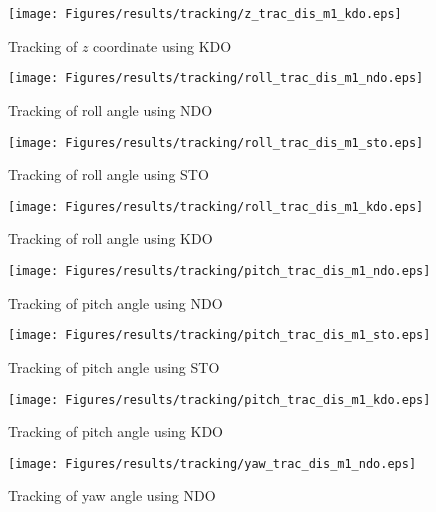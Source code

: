 \documentclass{article}
\begin{document}
\begin{figure}[H]
\centering
\texttt{[image: Figures/results/tracking/z\_trac\_dis\_m1\_kdo.eps]}
\caption{Tracking of $z$ coordinate using KDO}
\label{z_trac_dis_m1_kdo}
\end{figure}

\begin{figure}[H]
\centering
\texttt{[image: Figures/results/tracking/roll\_trac\_dis\_m1\_ndo.eps]}
\caption{Tracking of roll angle using NDO}
\label{roll_trac_dis_m1_ndo}
\end{figure}

\begin{figure}[H]
\centering
\texttt{[image: Figures/results/tracking/roll\_trac\_dis\_m1\_sto.eps]}
\caption{Tracking of roll angle using STO}
\label{roll_trac_dis_m1_sto}
\end{figure}

\begin{figure}[H]
\centering
\texttt{[image: Figures/results/tracking/roll\_trac\_dis\_m1\_kdo.eps]}
\caption{Tracking of roll angle using KDO}
\label{roll_trac_dis_m1_kdo}
\end{figure}

\begin{figure}[H]
\centering
\texttt{[image: Figures/results/tracking/pitch\_trac\_dis\_m1\_ndo.eps]}
\caption{Tracking of pitch angle using NDO}
\label{pitch_trac_dis_m1_ndo}
\end{figure}

\begin{figure}[H]
\centering
\texttt{[image: Figures/results/tracking/pitch\_trac\_dis\_m1\_sto.eps]}
\caption{Tracking of pitch angle using STO}
\label{pitch_trac_dis_m1_sto}
\end{figure}

\begin{figure}[H]
\centering
\texttt{[image: Figures/results/tracking/pitch\_trac\_dis\_m1\_kdo.eps]}
\caption{Tracking of pitch angle using KDO}
\label{pitch_trac_dis_m1_kdo}
\end{figure}

\begin{figure}[H]
\centering
\texttt{[image: Figures/results/tracking/yaw\_trac\_dis\_m1\_ndo.eps]}
\caption{Tracking of yaw angle using NDO}
\label{yaw_trac_dis_m1_ndo}
\end{figure}
\end{document}
